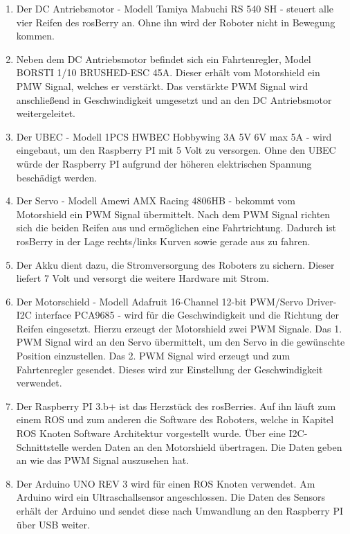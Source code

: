\documentclass[conference]{IEEEtran}
\begin{document}
    \begin{enumerate}
        \item Der DC Antriebsmotor - Modell Tamiya Mabuchi RS 540 SH - steuert alle vier Reifen des rosBerry an. Ohne ihn wird der Roboter nicht in Bewegung kommen.
        \item Neben dem DC Antriebsmotor befindet sich ein Fahrtenregler, Model BORSTI 1/10 BRUSHED-ESC 45A. Dieser erhält vom Motorshield ein PMW Signal, welches er verstärkt. Das verstärkte PWM Signal wird anschließend in Geschwindigkeit umgesetzt und an den DC Antriebsmotor weitergeleitet.
        \item Der UBEC - Modell 1PCS HWBEC Hobbywing 3A 5V 6V max 5A - wird eingebaut, um den Raspberry PI mit 5 Volt zu versorgen. Ohne den UBEC würde der Raspberry PI aufgrund der höheren elektrischen Spannung beschädigt werden.
        \item Der Servo - Modell Amewi AMX Racing 4806HB - bekommt vom Motorshield ein PWM Signal übermittelt. Nach dem PWM Signal richten sich die beiden Reifen aus und ermöglichen eine Fahrtrichtung. Dadurch ist rosBerry in der Lage rechts/links Kurven sowie gerade aus zu fahren.
        \item Der Akku dient dazu, die Stromversorgung des Roboters zu sichern. Dieser liefert 7 Volt und versorgt die weitere Hardware mit Strom.
        \item Der Motorschield - Modell Adafruit 16-Channel 12-bit PWM/Servo Driver-I2C interface PCA9685 - wird für die Geschwindigkeit und die Richtung der Reifen eingesetzt. Hierzu erzeugt der Motorshield zwei PWM Signale. Das 1. PWM Signal wird an den Servo übermittelt, um den Servo in die gewünschte Position einzustellen. Das 2. PWM Signal wird erzeugt und zum Fahrtenregler gesendet. Dieses wird zur Einstellung der Geschwindigkeit verwendet.
        \item Der Raspberry PI 3.b+ ist das Herzstück des rosBerries. Auf ihn läuft zum einem ROS und zum anderen die Software des Roboters, welche in Kapitel ROS Knoten Software Architektur vorgestellt wurde. 
        Über eine I2C-Schnittstelle werden Daten an den Motorshield übertragen. Die Daten geben an wie das PWM Signal auszusehen hat.
        \item Der Arduino UNO REV 3 wird für einen ROS Knoten verwendet. Am Arduino wird ein Ultraschallsensor angeschlossen. Die Daten des Sensors erhält der Arduino und sendet diese nach Umwandlung an den Raspberry PI über USB weiter.
        \begin{figure}[!ht]

\end{figure}
\end{enumerate}
\end{document}
